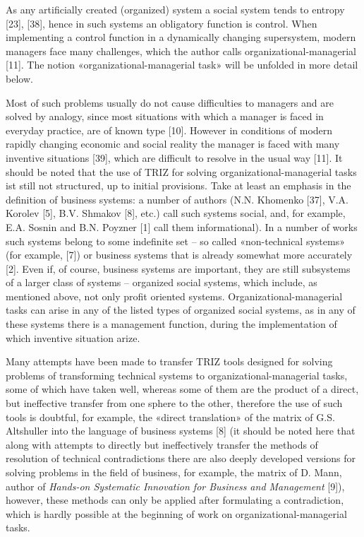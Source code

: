 \documentclass[11pt,a4paper]{book}
\begin{document}
As any artificially created (organized) system a social system tends to
entropy [23], [38], hence in such systems an obligatory function is control.
When implementing a control function in a dynamically changing supersystem,
modern managers face many challenges, which the author calls
organizational-managerial [11]. The notion «organizational-managerial task»
will be unfolded in more detail below.

Most of such problems usually do not cause difficulties to managers and are
solved by analogy, since most situations with which a manager is faced in
everyday practice, are of known type [10]. However in conditions of modern
rapidly changing economic and social reality the manager is faced with many
inventive situations [39], which are difficult to resolve in the usual way
[11].  It should be noted that the use of TRIZ for solving
organizational-managerial tasks ist still not structured, up to initial
provisions. Take at least an emphasis in the definition of business systems: a
number of authors (N.N. Khomenko [37], V.A. Korolev [5], B.V. Shmakov [8],
etc.) call such systems social, and, for example, E.A. Sosnin and B.N. Poyzner
[1] call them informational).  In a number of works such systems belong to
some indefinite set -- so called «non-technical systems» (for example, [7]) or
business systems that is already somewhat more accurately [2]. Even if, of
course, business systems are important, they are still subsystems of a larger
class of systems -- organized social systems, which include, as mentioned
above, not only profit oriented systems. Organizational-managerial tasks can
arise in any of the listed types of organized social systems, as in any of
these systems there is a management function, during the implementation of
which inventive situation arize.

Many attempts have been made to transfer TRIZ tools designed for solving
problems of transforming technical systems to organizational-managerial tasks,
some of which have taken well, whereas some of them are the product of a
direct, but ineffective transfer from one sphere to the other, therefore the
use of such tools is doubtful, for example, the «direct translation» of the
matrix of G.S. Altshuller into the language of business systems [8] (it should
be noted here that along with attempts to directly but ineffectively transfer
the methods of resolution of technical contradictions there are also deeply
developed versions for solving problems in the field of business, for example,
the matrix of D. Mann, author of \emph{Hands-on Systematic Innovation for
  Business and Management} [9]), however, these methods can only be applied
after formulating a contradiction, which is hardly possible at the beginning
of work on organizational-managerial tasks.
\end{document}
